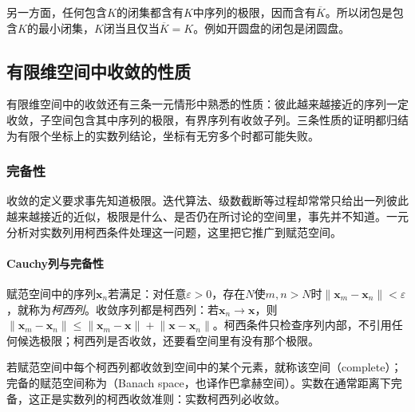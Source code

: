 另一方面，任何包含$K$的闭集都含有$K$中序列的极限，因而含有$\overline K$。所以闭包是包含$K$的最小闭集，$K$闭当且仅当$\overline K=K$。例如开圆盘的闭包是闭圆盘。

\subsection{有限维空间中收敛的性质}
\label{sec:ls-finite-dimensional-convergence-properties}

有限维空间中的收敛还有三条一元情形中熟悉的性质：彼此越来越接近的序列一定收敛，子空间包含其中序列的极限，有界序列有收敛子列。三条性质的证明都归结为有限个坐标上的实数列结论，坐标有无穷多个时都可能失败。

\subsubsection{完备性}
\label{sec:ls-banach-spaces}

收敛的定义要求事先知道极限。迭代算法、级数截断等过程却常常只给出一列彼此越来越接近的近似，极限是什么、是否仍在所讨论的空间里，事先并不知道。一元分析对实数列用柯西条件处理这一问题，这里把它推广到赋范空间。

\paragraph{Cauchy列与完备性}
赋范空间中的序列$\bm x_n$若满足：对任意$\varepsilon>0$，存在$N$使$m,n>N$时$\lVert\bm x_m-\bm x_n\rVert<\varepsilon$，就称为\emph{柯西列}。收敛序列都是柯西列：若$\bm x_n\to\bm x$，则$\lVert\bm x_m-\bm x_n\rVert\leq\lVert\bm x_m-\bm x\rVert+\lVert\bm x-\bm x_n\rVert$。柯西条件只检查序列内部，不引用任何候选极限；柯西列是否收敛，还要看空间里有没有那个极限。

若赋范空间中每个柯西列都收敛到空间中的某个元素，就称该空间（complete）；完备的赋范空间称为（Banach space，也译作巴拿赫空间）。实数在通常距离下完备，这正是实数列的柯西收敛准则：实数柯西列必收敛。

